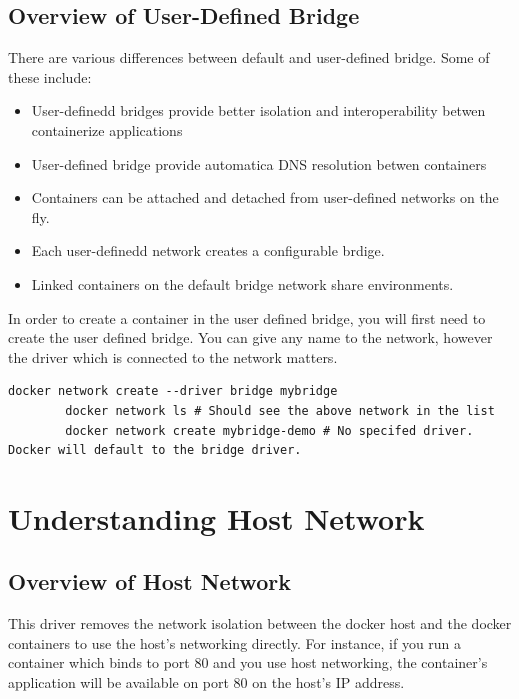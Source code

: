 \documentclass[11pt]{book}
\begin{document}
    \subsection{Overview of User-Defined Bridge}
    There are various differences between default and user-defined bridge.
    Some of these include:
    \begin{itemize}
        \item User-definedd bridges provide better isolation and interoperability betwen containerize applications
        \item User-defined bridge provide automatica DNS resolution betwen containers
        \item Containers can be attached and detached from user-defined networks on the fly.
        \item Each user-definedd network creates a configurable brdige.
        \item Linked containers on the default bridge network share environments.
    \end{itemize}

    In order to create a container in the user defined bridge, you will first need to create the user defined bridge.
    You can give any name to the network, however the driver which is connected to the network matters.

    \begin{lstlisting}[style=terminal]
        docker network create --driver bridge mybridge
        docker network ls # Should see the above network in the list
        docker network create mybridge-demo # No specifed driver. Docker will default to the bridge driver.
    \end{lstlisting}

    \section{Understanding Host Network}
    \subsection{Overview of Host Network}
    This driver removes the network isolation between the docker host and the docker containers to use the host's networking directly.
    For instance, if you run a container which binds to port 80 and you use host networking, the container's application will be available on port 80 on the host's IP address.

\end{document}
